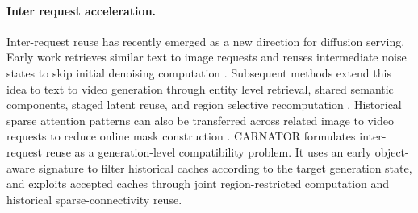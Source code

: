 \paragraph{Inter request acceleration.}
Inter-request reuse has recently emerged as a new direction for diffusion serving. Early work retrieves similar text to image requests and reuses intermediate noise states to skip initial denoising computation \citep{agarwal2024approximate}. Subsequent methods extend this idea to text to video generation through entity level retrieval, shared semantic components, staged latent reuse, and region selective recomputation \citep{cherian2026chai,liu2026beyond}. Historical sparse attention patterns can also be transferred across related image to video requests to reduce online mask construction \citep{liu2026chorus}. 
CARNATOR formulates inter-request reuse as a generation-level compatibility problem.
It uses an early object-aware signature to filter historical caches according to the target generation state, and exploits accepted caches through joint region-restricted computation and historical sparse-connectivity reuse.
